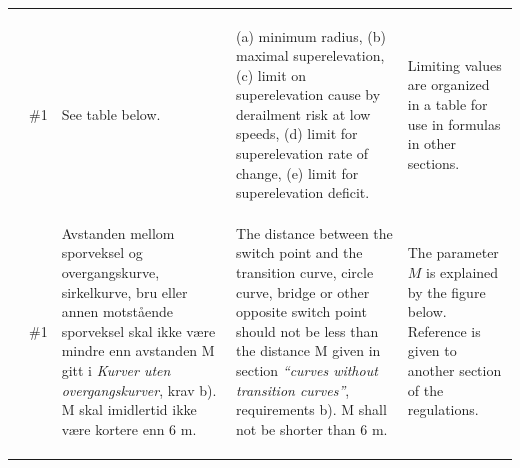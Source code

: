 \begin{longtable}[h]{L{0.5cm} L{0.8cm} L{4.0cm} L{4.0cm} L{5.0cm}}
& & & & \\ 
& & & & \\ 
 \\*
& \#1 & 
See table below.
& (a) minimum radius, (b) maximal superelevation, 
(c) limit on superelevation cause by derailment risk at low speeds,
(d) limit for superelevation rate of change,
(e) limit for superelevation deficit.
&
Limiting values are organized in a table for use in formulas in other sections.
\\*
& 
\\
& & & & \\
 \\*
& \#1 & 
Avstanden mellom sporveksel og overgangskurve, sirkelkurve, bru eller annen motstående sporveksel skal ikke være mindre enn avstanden M gitt i \emph{Kurver uten overgangskurver}, krav b). M skal imidlertid ikke være kortere enn 6 m. 
& 
The distance between the switch point and the transition curve, circle curve, bridge or other opposite switch point should not be less than the distance M given in section \emph{``curves without transition curves''}, requirements b). M shall not be shorter than 6 m.
&
The parameter $M$ is explained by the figure below. Reference is given to 
another section of the regulations.
\\*
& \\
& & & & \\
\tpar{ 
}
\end{longtable}
